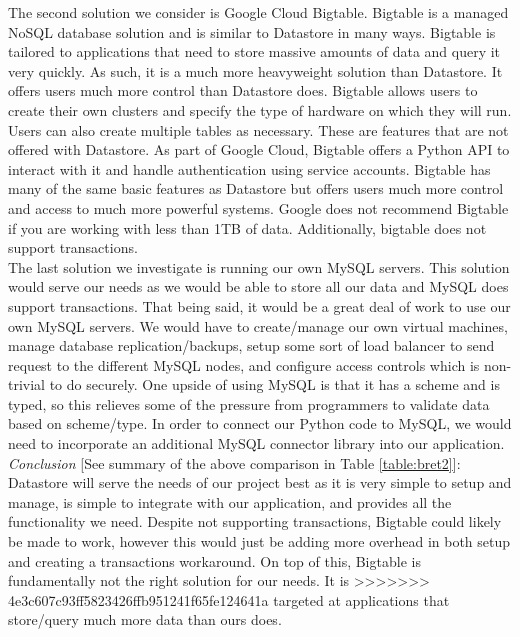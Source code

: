 \documentclass[10pt, onecolumn, draftclsnofoot, letterpaper, compsoc]{IEEEtran}
\begin{document}
The second solution we consider is Google Cloud Bigtable. Bigtable is a managed NoSQL
database solution and is similar to Datastore in many ways\cite{cloudBigtable}.
Bigtable is tailored to applications that need to store massive amounts of data
and query it very quickly\cite{cloudBigtable}. As such, it is a much more heavyweight
solution than Datastore. It offers users much more control than Datastore does.
Bigtable allows users to create their own clusters and specify the type of hardware on
which they will run\cite{cloudBigtableDocs}. Users can also create multiple tables
as necessary\cite{cloudBigtableDocs}. These are features that are not offered with
Datastore. As part of Google Cloud, Bigtable offers a Python API to interact with it
and handle authentication using service accounts\cite{cloudBigtableDocs}. Bigtable has
many of the same basic features as Datastore but offers users much more control
and access to much more powerful systems. Google does not recommend Bigtable if
you are working with less than 1TB of data\cite{cloudBigtable}. Additionally,
bigtable does not support transactions\cite{cloudBigtable}. \\

The last solution we investigate is running our own MySQL servers. This solution
would serve our needs as we would be able to store all our data and MySQL
does support transactions. That being said, it would be a great deal of work to
use our own MySQL servers. We would have to create/manage our own virtual machines,
manage database replication/backups, setup some sort of load balancer to send
request to the different MySQL nodes, and configure access controls which is
non-trivial to do securely. One upside of using MySQL is that it has a scheme
and is typed, so this relieves some of the pressure from programmers to
validate data based on scheme/type. In order to connect our Python code to MySQL,
we would need to incorporate an additional MySQL connector library into our
application\cite{mysql}. \\

\textit{Conclusion} [See summary of the above comparison in Table \ref{table:bret2}]:
Datastore will serve the needs of our project best as it is
very simple to setup and manage, is simple to integrate with our application,
and provides all the functionality we need. Despite not supporting transactions,
Bigtable could likely be made to work, however this would just be adding more
overhead in both setup and creating a transactions workaround. On top of this,
Bigtable is fundamentally not the right solution for our needs. It is
>>>>>>> 4e3c607c93ff5823426ffb951241f65fe124641a
targeted at applications that store/query much more data than ours does. \\
\end{document}
